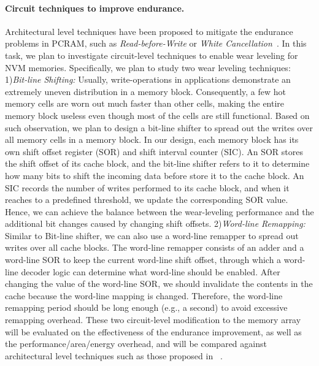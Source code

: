 \paragraph{Circuit techniques to improve endurance.} Architectural level techniques have been proposed to mitigate the endurance problems in PCRAM, such as \textit{Read-before-Write} or \textit{White Cancellation}~\cite{PRAM:Microsoft,PRAM:IBM}. In this task, we plan to investigate circuit-level techniques to enable wear leveling for NVM memories. Specifically, we plan to study
two wear leveling techniques: 1)\textit{Bit-line Shifting:} Usually, write-operations in applications demonstrate an extremely uneven distribution in a memory block. Consequently, a few hot memory cells are worn out much faster than other cells, making the entire memory block useless even though most of the cells are still functional. Based on such observation, we plan to design a bit-line shifter to spread out the writes over all memory cells in a memory block. In our design, each memory block has its own shift offset register (SOR) and shift interval counter (SIC). An SOR stores the shift offset of its cache block, and the bit-line shifter refers
to it to determine how many bits to shift the incoming data before store it to the cache block. An SIC records the number of writes performed to its cache block, and when it reaches to a predefined threshold, we update the corresponding SOR
value.  Hence, we can achieve
the balance between the wear-leveling performance and the
additional bit changes caused by changing shift offsets. 2)\textit{Word-line Remapping:} Similar to Bit-line shifter, we can also
use a word-line remapper to spread out writes over all cache
blocks. The word-line remapper consists of an adder and a
word-line SOR to keep the current word-line shift offset,
through which a word-line decoder logic can determine what
word-line should be enabled.   After changing the value of the word-line SOR, we should
invalidate the contents in the cache because the word-line mapping
is changed. Therefore, the word-line remapping period
should be long enough (e.g., a second) to avoid excessive
remapping overhead. These two circuit-level modification to the memory array will be evaluated on the effectiveness of the endurance improvement, as well as the performance/area/energy overhead, and will be compared against architectural level techniques such as those proposed in  ~\cite{PRAM:Microsoft,PRAM:IBM}.


